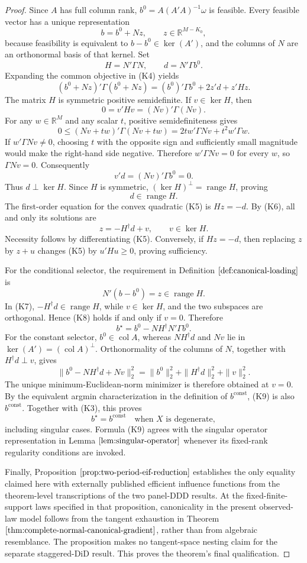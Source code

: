 \documentclass{article}
\begin{document}
\begin{proof}
Since \(A\) has full column rank, \(b^0=A(A'A)^{-1}\omega\) is feasible.  Every feasible vector has a unique representation
\[
b=b^0+Nz,
\qquad z\in\mathbb R^{M-K_0},
\tag{K4}
\]
because feasibility is equivalent to \(b-b^0\in\ker(A')\), and the columns of \(N\) are an orthonormal basis of that kernel.  Set
\[
H=N'\Gamma N,
\qquad d=N'\Gamma b^0.
\]
Expanding the common objective in (K4) yields
\[
(b^0+Nz)'\Gamma(b^0+Nz)
=(b^0)'\Gamma b^0+2z'd+z'Hz.
\tag{K5}
\]
The matrix \(H\) is symmetric positive semidefinite.  If \(v\in\ker H\), then
\[
0=v'Hv=(Nv)'\Gamma(Nv).
\]
For any \(w\in\mathbb R^M\) and any scalar \(t\), positive semidefiniteness gives
\[
0\le (Nv+tw)'\Gamma(Nv+tw)
=2t w'\Gamma Nv+t^2w'\Gamma w.
\]
If \(w'\Gamma Nv\ne0\), choosing \(t\) with the opposite sign and sufficiently small magnitude would make the right-hand side negative.  Therefore \(w'\Gamma Nv=0\) for every \(w\), so \(\Gamma Nv=0\).  Consequently
\[
v'd=(Nv)'\Gamma b^0=0.
\]
Thus \(d\perp\ker H\).  Since \(H\) is symmetric, \((\ker H)^\perp=\operatorname{range}H\), proving
\[
d\in\operatorname{range}H.
\tag{K6}
\]
The first-order equation for the convex quadratic (K5) is \(Hz=-d\).  By (K6), all and only its solutions are
\[
z=-H^\dagger d+v,
\qquad v\in\ker H.
\tag{K7}
\]
Necessity follows by differentiating (K5).  Conversely, if \(Hz=-d\), then replacing \(z\) by \(z+u\) changes (K5) by \(u'Hu\ge0\), proving sufficiency.

For the conditional selector, the requirement in Definition \(\ref{def:canonical-loading}\) is
\[
N'(b-b^0)=z\in\operatorname{range}H.
\tag{K8}
\]
In (K7), \(-H^\dagger d\in\operatorname{range}H\), while \(v\in\ker H\), and the two subspaces are orthogonal.  Hence (K8) holds if and only if \(v=0\).  Therefore
\[
b^\star=b^0-NH^\dagger N'\Gamma b^0.
\tag{K9}
\]
For the constant selector, \(b^0\in\operatorname{col}A\), whereas \(NH^\dagger d\) and \(Nv\) lie in \(\ker(A')=(\operatorname{col}A)^\perp\).  Orthonormality of the columns of \(N\), together with \(H^\dagger d\perp v\), gives
\[
\|b^0-NH^\dagger d+Nv\|_2^2
=\|b^0\|_2^2+\|H^\dagger d\|_2^2+\|v\|_2^2.
\tag{K10}
\]
The unique minimum-Euclidean-norm minimizer is therefore obtained at \(v=0\).  By the equivalent argmin characterization in the definition of \(b^{\mathrm{const}}\), (K9) is also \(b^{\mathrm{const}}\).  Together with (K3), this proves
\[
b^\star=b^{\mathrm{const}}
\quad\text{when \(X\) is degenerate},
\]
including singular cases.  Formula (K9) agrees with the singular operator representation in Lemma \(\ref{lem:singular-operator}\) whenever its fixed-rank regularity conditions are invoked.

Finally, Proposition \(\ref{prop:two-period-eif-reduction}\) establishes the only equality claimed here with externally published efficient influence functions from the theorem-level transcriptions of the two panel-DDD results.  At the fixed-finite-support laws specified in that proposition, canonicality in the present observed-law model follows from the tangent exhaustion in Theorem \(\ref{thm:complete-normal-canonical-gradient}\), rather than from algebraic resemblance.  The proposition makes no tangent-space nesting claim for the separate staggered-DiD result.  This proves the theorem's final qualification.
\end{proof}
\end{document}
